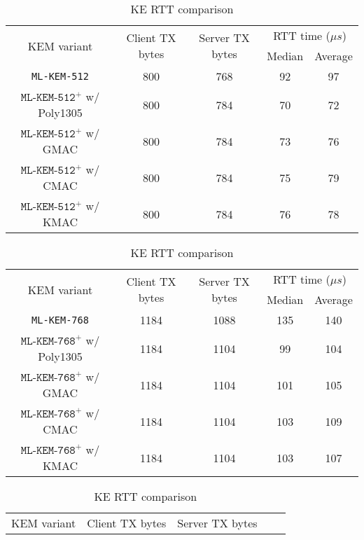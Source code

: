 \documentclass[journal=tches,submission]{iacrtrans}
\newcommand{\us}{\mu s}
\begin{document}
\begin{table}[H]
    \centering
    \small
    \caption{KE RTT comparison}\label{tbl:ke-rtt}

    \begin{tabular}{|c|c|c|c|c|}
        \hline
        \multirow{2}{*}{KEM variant}
        & \multirow{2}{*}{Client TX bytes}
        & \multirow{2}{*}{Server TX bytes}
        & \multicolumn{2}{|c|}{RTT time ($\us$)} \\
        \cline{4-5}
        & & & Median & Average \\
        \hline
        \texttt{ML-KEM-512} & 800 & 768 & 92 & 97 \\
        \hline
        $\texttt{ML-KEM-512}^+$ w/ Poly1305 & 800 & 784 & 70 & 72 \\
        \hline
        $\texttt{ML-KEM-512}^+$ w/ GMAC & 800 & 784 & 73 & 76 \\
        \hline
        $\texttt{ML-KEM-512}^+$ w/ CMAC & 800 & 784 & 75 & 79 \\
        \hline
        $\texttt{ML-KEM-512}^+$ w/ KMAC & 800 & 784 & 76 & 78 \\
        \hline
    \end{tabular}\vspace{0.3cm}
    \begin{tabular}{|c|c|c|c|c|}
        \hline
        \multirow{2}{*}{KEM variant}
        & \multirow{2}{*}{Client TX bytes}
        & \multirow{2}{*}{Server TX bytes}
        & \multicolumn{2}{|c|}{RTT time ($\us$)} \\
        \cline{4-5}
        & & & Median & Average \\
        \hline
        \texttt{ML-KEM-768} & 1184 & 1088 & 135 & 140 \\
        \hline
        $\texttt{ML-KEM-768}^+$ w/ Poly1305 & 1184 & 1104 & 99 & 104 \\
        \hline
        $\texttt{ML-KEM-768}^+$ w/ GMAC & 1184 & 1104 & 101 & 105 \\
        \hline
        $\texttt{ML-KEM-768}^+$ w/ CMAC & 1184 & 1104 & 103 & 109 \\
        \hline
        $\texttt{ML-KEM-768}^+$ w/ KMAC & 1184 & 1104 & 103 & 107 \\
        \hline
    \end{tabular}\vspace{0.3cm}
    \begin{tabular}{|c|c|c|c|c|}
        \hline
        \multirow{2}{*}{KEM variant}
        & \multirow{2}{*}{Client TX bytes}
        & \multirow{2}{*}{Server TX bytes}

\end{tabular}
\end{table}
\end{document}
